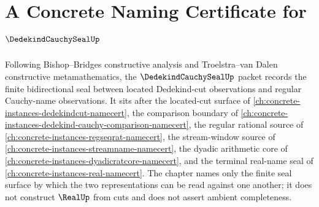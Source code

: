 \chapter{A Concrete Naming Certificate for $\DedekindCauchySealUp$}
\label{ch:concrete-instances-dedekindcauchyseal-namecert}

Following Bishop--Bridges constructive analysis and Troelstra--van Dalen constructive metamathematics, the $\DedekindCauchySealUp$ packet records the finite bidirectional seal between located Dedekind-cut observations and regular Cauchy-name observations. It sits after the located-cut surface of \autoref{ch:concrete-instances-dedekindcut-namecert}, the comparison boundary of \autoref{ch:concrete-instances-dedekind-cauchy-comparison-namecert}, the regular rational source of \autoref{ch:concrete-instances-regseqrat-namecert}, the stream-window source of \autoref{ch:concrete-instances-streamname-namecert}, the dyadic arithmetic core of \autoref{ch:concrete-instances-dyadicratcore-namecert}, and the terminal real-name seal of \autoref{ch:concrete-instances-real-namecert}. The chapter names only the finite seal surface by which the two representations can be read against one another; it does not construct $\RealUp$ from cuts and does not assert ambient completeness.

